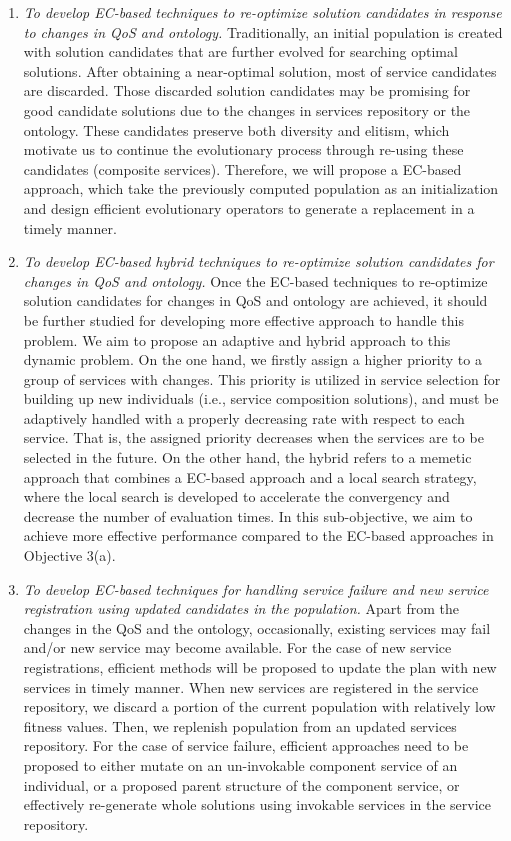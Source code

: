 \begin{enumerate}
  \begin{enumerate}
 \item \label{Obj:3.1} \emph{To develop EC-based techniques to re-optimize solution candidates in response to changes in QoS and ontology.} Traditionally, an initial population is created with solution candidates that are further evolved for searching optimal solutions. After obtaining a near-optimal solution, most of service candidates are discarded. Those discarded solution candidates may be promising for good candidate solutions due to the changes in services repository or the ontology. These candidates preserve both diversity and elitism, which motivate us to continue the evolutionary process through re-using these candidates (composite services). Therefore, we will propose a EC-based approach, which take the previously computed population as an initialization and design efficient evolutionary operators to generate a replacement in a timely manner.  
 
 \item \emph{To develop EC-based hybrid techniques to re-optimize solution candidates for changes in QoS and ontology.} Once the EC-based techniques to re-optimize solution candidates for changes in QoS and ontology are achieved, it should be further studied for developing more effective approach to handle this problem. We aim to propose an adaptive and hybrid approach to this dynamic problem. On the one hand, we firstly assign a higher priority to a group of services with changes. This priority is utilized in service selection for building up new individuals (i.e., service composition solutions), and must be adaptively handled with a properly decreasing rate with respect to each service. That is, the assigned priority decreases when the services are to be selected in the future. On the other hand, the hybrid refers to a memetic approach that combines a EC-based approach and a local search strategy, where the local search is developed to accelerate the convergency and decrease the number of evaluation times. In this sub-objective, we aim to achieve more effective performance compared to the EC-based approaches in Objective 3(a).
 
 
 \item \emph{To develop EC-based techniques for handling service failure and new service registration using updated candidates in the population.} Apart from the changes in the QoS and the ontology, occasionally, existing services may fail and/or new service may become available. For the case of new service registrations, efficient methods will be proposed to update the plan with new services in timely manner. When new services are registered in the service repository, we discard a portion of the current population with relatively low fitness values. Then, we replenish population from an updated services repository. For the case of service failure, efficient approaches need to be proposed to either mutate on an un-invokable component service of an individual, or a proposed parent structure of the component service, or effectively re-generate whole solutions using invokable services in the service repository. 
 \end{enumerate}
   

\end{enumerate}
